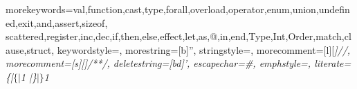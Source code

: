   { morekeywords={val,function,cast,type,forall,overload,operator,enum,union,undefined,exit,and,assert,sizeof,
      scattered,register,inc,dec,if,then,else,effect,let,as,@,in,end,Type,Int,Order,match,clause,struct},
    keywordstyle={\bf\ttfamily},
    morestring=[b]'',
    stringstyle={\ttfamily\color{red}},
    morecomment=[l][\itshape\color{DarkGreen}]{//},
    morecomment=[s][\itshape\color{DarkGreen}]{/*}{*/},
    deletestring=[bd]{'},
    escapechar=\#,
    emphstyle={\it},
    literate=
      {\{|}{{$\{|$}}1
      {|\}}{{$|\}$}}1
  }


{
  \newcommand{\sailcode}[1]{}
  \newcommand{\sailnote}[1]{}
  \newcommand{\sailval}[1]{}
  \newcommand{\sailvalandfun}[1]{}
}

\newcommand{\sailwithnote}[2]{\sailnote{#1}\sailcode{#2}}

\newenvironment{formalspec}
{ \vspace{-0.2in}
  \begin{quotation}
  \noindent
  \small \em
  \rule{\linewidth}{1pt}\\
}
{
  \rule{\linewidth}{1pt}
  \end{quotation}
  \vspace{-0.2in}
}
